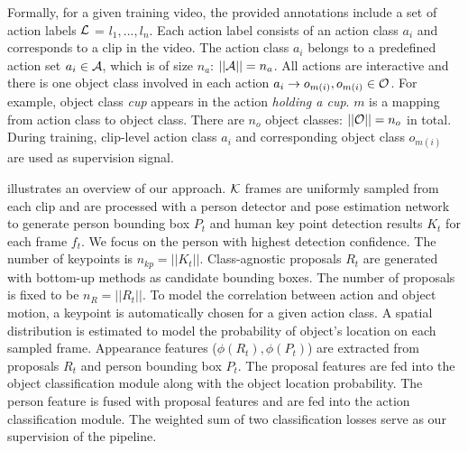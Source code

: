 Formally, for a given training video, the provided annotations include a set of action labels ${\mathcal L}$ = {$l_1,...,l_n$}. Each action label consists of an action class $a_i$ and corresponds to a clip in the video. The action class $a_i$ belongs to a predefined action set $a_i \in {\mathcal A}$, which is of size $n_{a}$: $||{\mathcal A}||=n_{a}$. All actions are interactive and there is one object class involved in each action $a_i\rightarrow o_{m(i)}, o_{m(i)}\in {\mathcal O}$. For example, object class \textit{cup} appears in the action \textit{holding a cup}. $m$ is a mapping from action class to object class. There are $n_{o}$ object classes: $||{\mathcal O}||=n_{o}$ in total. During training, clip-level action class $a_i$ and corresponding object class $o_{m(i)}$ are used as supervision signal.

 illustrates an overview of our approach. ${\mathcal K}$ frames are uniformly sampled from each clip and are processed with a person detector and pose estimation network to generate person bounding box $P_t$ and human key point detection results $K_t$ for each frame $f_t$. We focus on the person with highest detection confidence. The number of keypoints is $n_{kp}=||K_t||$. Class-agnostic proposals $R_t$ are generated with bottom-up methods as candidate bounding boxes. The number of proposals is fixed to be $n_R=||R_t||$. To model the correlation between action and object motion, a keypoint is automatically chosen for a given action class. A spatial distribution is estimated to model the probability of object's location on each sampled frame. Appearance features ($\phi(R_t), \phi(P_t)$) are extracted from proposals $R_t$ and person bounding box $P_t$. The proposal features are fed into the object classification module along with the object location probability. The person feature is fused with proposal features and are fed into the action classification module. The weighted sum of two classification losses serve as our supervision of the pipeline.


